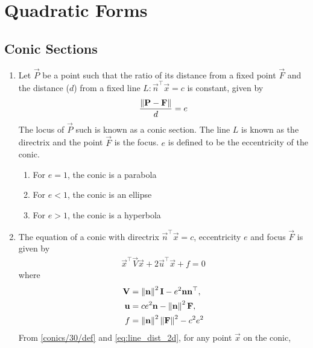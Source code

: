 \documentclass[journal,12pt,twocolumn]{IEEEtran}
\renewcommand\thesection{\arabic{section}}
\renewcommand\thesubsection{\thesection.\arabic{subsection}}
\begin{document}
\section{Quadratic Forms}
\subsection{Conic Sections}
\renewcommand{\theequation}{\theenumi}
\begin{enumerate}[label=\thesubsection.\arabic*.,ref=\thesubsection.\theenumi]
\item Let $\vec{P}$ be a point such that the ratio of its distance from a fixed point $\vec{F}$ and the distance ($d$) from a fixed line 
$L: \vec{n}^{\top}\vec{x}=c$ is constant, given by 
\begin{align}
\label{conics/30/def}
\frac{\left\lVert\mathbf{P}-\mathbf{F}\right\rVert}{d} = e    
\end{align}
The locus of $\vec{P}$ such is known as a conic section. The line $L$ is known as the directrix and the point $\vec{F}$ is the focus. $e$ is defined to be 
the eccentricity of the conic.  
\begin{enumerate}
    \item For $e = 1$, the conic is a parabola
    \item For $e < 1$, the conic is an ellipse
    \item For $e > 1$, the conic is a hyperbola
\end{enumerate}
\item The equation of  a conic with directrix $\vec{n}^{\top}\vec{x} = c$, eccentricity $e$ and focus $\vec{F}$ is given by 
\begin{align}
    \label{eq:conic_quad_form}
    \vec{x}^{\top}\vec{V}\vec{x}+2\vec{u}^{\top}\vec{x}+f=0
    \end{align}
where     
\begin{align}
  \label{eq:conic_quad_form_v}
\mathbf{V} &=\left\lVert\mathbf{n}\right\rVert^2\mathbf{I}-e^2\mathbf{n}\mathbf{n}^{\top}, 
\\
\label{eq:conic_quad_form_u}
\mathbf{u} &= ce^2\mathbf{n}-\left\lVert\mathbf{n}\right\rVert^2\mathbf{F}, 
\\
\label{eq:conic_quad_form_f}
f &= \left\lVert\mathbf{n}\right\rVert^2\left\lVert\mathbf{F}\right\rVert^2-c^2e^2
    \end{align}
    \solution  From \eqref{conics/30/def} and \eqref{eq:line_dist_2d},  for any point $\vec{x}$ on the conic,
		\begin{align}	

\end{align}
\end{enumerate}
\end{document}
